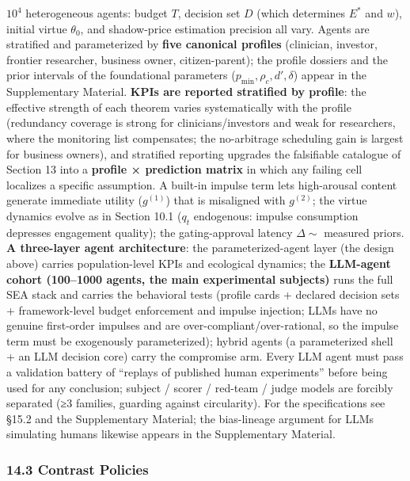 \documentclass[
  11pt]{article}
\begin{document}
\(10^4\) heterogeneous agents: budget \(T\), decision set \(D\) (which
determines \(E^*\) and \(w\)), initial virtue \(\theta_0\), and
shadow-price estimation precision all vary. Agents are stratified and
parameterized by \textbf{five canonical profiles} (clinician, investor,
frontier researcher, business owner, citizen-parent); the profile
dossiers and the prior intervals of the foundational parameters
(\(p_{\min}, \rho_c, d', \delta\)) appear in the Supplementary Material.
\textbf{KPIs are reported stratified by profile}: the effective strength
of each theorem varies systematically with the profile (redundancy
coverage is strong for clinicians/investors and weak for researchers,
where the monitoring list compensates; the no-arbitrage scheduling gain
is largest for business owners), and stratified reporting upgrades the
falsifiable catalogue of Section 13 into a \textbf{profile × prediction
matrix} in which any failing cell localizes a specific assumption. A
built-in impulse term lets high-arousal content generate immediate
utility (\(g^{(1)}\)) that is misaligned with \(g^{(2)}\); the virtue
dynamics evolve as in Section 10.1 (\(q_t\) endogenous: impulse
consumption depresses engagement quality); the gating-approval latency
\(\Delta \sim\) measured priors. \textbf{A three-layer agent
architecture}: the parameterized-agent layer (the design above) carries
population-level KPIs and ecological dynamics; the \textbf{LLM-agent
cohort (100--1000 agents, the main experimental subjects)} runs the full
SEA stack and carries the behavioral tests (profile cards + declared
decision sets + framework-level budget enforcement and impulse
injection; LLMs have no genuine first-order impulses and are
over-compliant/over-rational, so the impulse term must be exogenously
parameterized); hybrid agents (a parameterized shell + an LLM decision
core) carry the compromise arm. Every LLM agent must pass a validation
battery of ``replays of published human experiments'' before being used
for any conclusion; subject / scorer / red-team / judge models are
forcibly separated (≥3 families, guarding against circularity). For the
specifications see §15.2 and the Supplementary Material; the
bias-lineage argument for LLMs simulating humans likewise appears in the
Supplementary Material.

\subsubsection{14.3 Contrast Policies}\label{contrast-policies}
\end{document}
